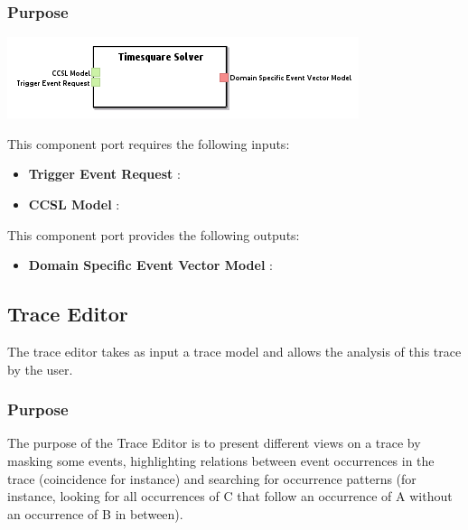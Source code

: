 \documentclass{gemoc} %
\begin{document}

\subsubsection{Purpose}


\begin{center}
\includegraphics*[trim=0.0cm 0.0cm 0cm 0.0cm, clip=true]{../images/generated/Generated_Timesquare_Solver.png}
\end{center}

This component port requires the following inputs:
\begin{itemize}
  \item \textbf{Trigger Event Request} :
  \item \textbf{CCSL Model} :
\end{itemize}

This component port provides the following outputs:
\begin{itemize}
  \item \textbf{Domain Specific Event Vector Model} :
\end{itemize}


\subsection{Trace Editor}
The trace editor takes as input a trace model and allows the analysis of this trace by the user.

\subsubsection{Purpose}
The purpose of the Trace Editor is to present different views on a trace by masking some events, highlighting relations between event occurrences in the trace (coincidence for instance) and searching for occurrence patterns (for instance, looking for all occurrences of C that follow an occurrence of A without an occurrence of B in between).
 
\end{document}
